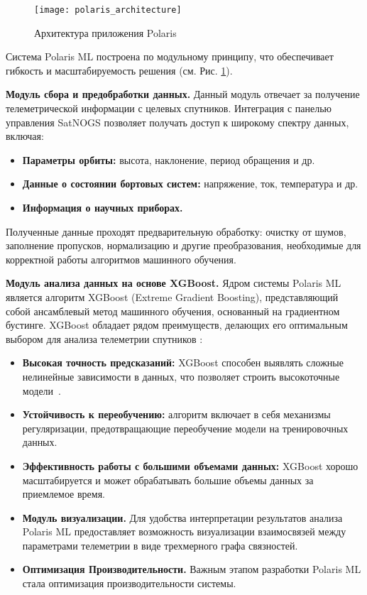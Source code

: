 \documentclass[14pt, a4paper]{../cls/coursework}
\begin{document}
    \begin{figure}[htbp]
        \centering
        \texttt{[image: polaris\_architecture]}
        \caption{Архитектура приложения Polaris}
        \label{fig:polaris_architecture}
    \end{figure}

    Система Polaris ML построена по модульному принципу, что обеспечивает гибкость и масштабируемость решения (см. Рис. \ref{fig:polaris_architecture}).

    \textbf{Модуль сбора и предобработки данных.} Данный модуль отвечает за получение телеметрической информации с целевых спутников.
    Интеграция с панелью управления SatNOGS позволяет получать доступ к широкому спектру данных, включая:
    \begin{itemize}
        \item \textbf{Параметры орбиты:} высота, наклонение, период обращения и др.
        \item \textbf{Данные о состоянии бортовых систем:} напряжение, ток, температура и др.
        \item \textbf{Информация о научных приборах.}
    \end{itemize}

    Полученные данные проходят предварительную обработку: очистку от шумов, заполнение пропусков, нормализацию и другие преобразования, необходимые для корректной работы алгоритмов машинного обучения.

    \textbf{Модуль анализа данных на основе XGBoost.} Ядром системы Polaris ML является алгоритм XGBoost (Extreme Gradient Boosting), представляющий собой ансамблевый метод машинного обучения, основанный на градиентном бустинге.
    XGBoost обладает рядом преимуществ, делающих его оптимальным выбором для анализа телеметрии спутников \cite{luppen2021introducing}:

    \begin{itemize}
        \item \textbf{Высокая точность предсказаний:} XGBoost способен выявлять сложные нелинейные зависимости в данных, что позволяет строить высокоточные модели~\cite{behaviour_based_anomaly_detection}.
        \item \textbf{Устойчивость к переобучению:} алгоритм включает в себя механизмы регуляризации, предотвращающие переобучение модели на тренировочных данных.
        \item \textbf{Эффективность работы с большими объемами данных:} XGBoost хорошо масштабируется и может обрабатывать большие объемы данных за приемлемое время.
        \item \textbf{Модуль визуализации.} Для удобства интерпретации результатов анализа Polaris ML предоставляет возможность визуализации взаимосвязей между параметрами телеметрии в виде трехмерного графа связностей.
        \item \textbf{Оптимизация Производительности.} Важным этапом разработки Polaris ML стала оптимизация производительности системы.
    \end{itemize}
\end{document}
